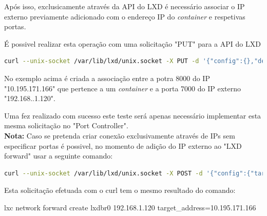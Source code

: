 Após isso, exclusicamente através da API do LXD é necessário associar o IP externo previamente
adicionado com o endereço IP do \textit{container} e respetivas portas.

É possivel realizar esta operação com uma solicitação "PUT" para a API do LXD

\begin{lstlisting}[language=Bash, caption={Exemplo de associação de IPs e portas usando a API do LXD}]
    curl --unix-socket /var/lib/lxd/unix.socket -X PUT -d '{"config":{},"description":"10.195.171.166","listen_address":"192.168.1.120","ports":[{"description":"","listen_port":"7000","protocol":"tcp","target_address":"","target_port":"8000"}]}'  lxd/1.0/networks/lxdbr0/forwards/192.168.120
\end{lstlisting}


No exemplo acima é criada a associação entre a potra 8000 do IP "10.195.171.166" que pertence a 
um \textit{container} e a porta 7000 do IP externo "192.168..1.120".

Uma fez realizado com sucesso este teste será apenas necessário implementar esta 
mesma solicitação no "Port Controller". \\






\textbf{Nota:} Caso se pretenda criar conexão exclusivamente através de IPs sem especificar portas é 
possivel, no momento de adição do IP externo ao "LXD forward" usar a seguinte comando:

\begin{lstlisting}[language=Bash, caption={Exemplo para registar um IP e associá-lo a um cinatiner (API do LXD)}]
    curl --unix-socket /var/lib/lxd/unix.socket -X POST -d '{"config":{"target_address":"10.195.171.166"},"description":"","listen_address":"192.168.1.120","ports":[]}'  lxd/1.0/networks/lxdbr0/forwards
\end{lstlisting}

Esta solicitação efetuada com o curl tem o mesmo resultado do comando:

\begin{tcolorbox}[colback=blue!5!white,colframe=blue!75!black]
   lxc network forward create lxdbr0 192.168.1.120 target\_address=10.195.171.166
\end{tcolorbox}










